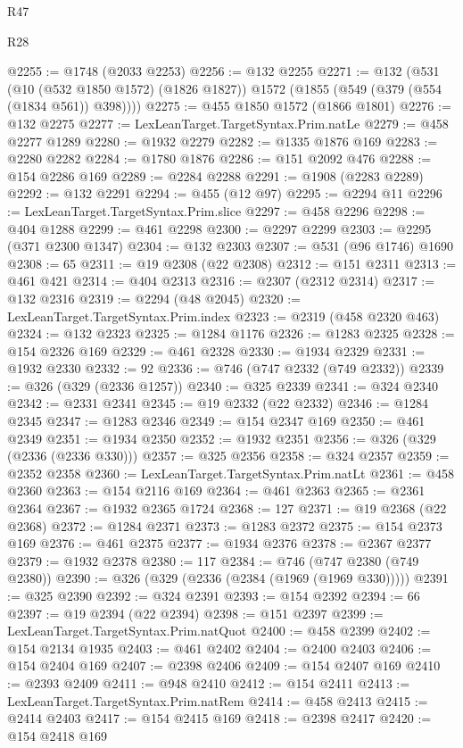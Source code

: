 \begin{lexlean}{R47}
\begin{lexlean}{R28}
\begin{coremodule}
{{{{{{{{{{{{{{{{{{{{{{{{{{{{{{{{{{{{{{{{{{{{{{{{{{{{{{{{{{{{{{{{{{{{{{{{{{{{{{{{{{{{{{{{{{{{{{{{{{{{{{{{{{{{{{{{{{{{{{{{{{{{{{{{{{{{{@2255 := @1748 (@2033 @2253)
@2256 := @132 @2255
@2271 := @132
    (@531
      (@10 (@532 @1850 @1572) (@1826 @1827))
      @1572
      (@1855 (@549 (@379 (@554 (@1834 @561)) @398))))
@2275 := @455 @1850 @1572 (@1866 @1801)
@2276 := @132 @2275
@2277 := LexLeanTarget.TargetSyntax.Prim.natLe
@2279 := @458 @2277 @1289
@2280 := @1932 @2279
@2282 := @1335 @1876 @169
@2283 := @2280 @2282
@2284 := @1780 @1876
@2286 := @151 @2092 @476
@2288 := @154 @2286 @169
@2289 := @2284 @2288
@2291 := @1908 (@2283 @2289)
@2292 := @132 @2291
@2294 := @455 (@12 @97)
@2295 := @2294 @11
@2296 := LexLeanTarget.TargetSyntax.Prim.slice
@2297 := @458 @2296
@2298 := @404 @1288
@2299 := @461 @2298
@2300 := @2297 @2299
@2303 := @2295 (@371 @2300 @1347)
@2304 := @132 @2303
@2307 := @531 (@96 @1746) @1690
@2308 := 65
@2311 := @19 @2308 (@22 @2308)
@2312 := @151 @2311
@2313 := @461 @421
@2314 := @404 @2313
@2316 := @2307 (@2312 @2314)
@2317 := @132 @2316
@2319 := @2294 (@48 @2045)
@2320 := LexLeanTarget.TargetSyntax.Prim.index
@2323 := @2319 (@458 @2320 @463)
@2324 := @132 @2323
@2325 := @1284 @1176
@2326 := @1283 @2325
@2328 := @154 @2326 @169
@2329 := @461 @2328
@2330 := @1934 @2329
@2331 := @1932 @2330
@2332 := 92
@2336 := @746 (@747 @2332 (@749 @2332))
@2339 := @326 (@329 (@2336 @1257))
@2340 := @325 @2339
@2341 := @324 @2340
@2342 := @2331 @2341
@2345 := @19 @2332 (@22 @2332)
@2346 := @1284 @2345
@2347 := @1283 @2346
@2349 := @154 @2347 @169
@2350 := @461 @2349
@2351 := @1934 @2350
@2352 := @1932 @2351
@2356 := @326 (@329 (@2336 (@2336 @330)))
@2357 := @325 @2356
@2358 := @324 @2357
@2359 := @2352 @2358
@2360 := LexLeanTarget.TargetSyntax.Prim.natLt
@2361 := @458 @2360
@2363 := @154 @2116 @169
@2364 := @461 @2363
@2365 := @2361 @2364
@2367 := @1932 @2365 @1724
@2368 := 127
@2371 := @19 @2368 (@22 @2368)
@2372 := @1284 @2371
@2373 := @1283 @2372
@2375 := @154 @2373 @169
@2376 := @461 @2375
@2377 := @1934 @2376
@2378 := @2367 @2377
@2379 := @1932 @2378
@2380 := 117
@2384 := @746 (@747 @2380 (@749 @2380))
@2390 := @326 (@329 (@2336 (@2384 (@1969 (@1969 @330)))))
@2391 := @325 @2390
@2392 := @324 @2391
@2393 := @154 @2392
@2394 := 66
@2397 := @19 @2394 (@22 @2394)
@2398 := @151 @2397
@2399 := LexLeanTarget.TargetSyntax.Prim.natQuot
@2400 := @458 @2399
@2402 := @154 @2134 @1935
@2403 := @461 @2402
@2404 := @2400 @2403
@2406 := @154 @2404 @169
@2407 := @2398 @2406
@2409 := @154 @2407 @169
@2410 := @2393 @2409
@2411 := @948 @2410
@2412 := @154 @2411
@2413 := LexLeanTarget.TargetSyntax.Prim.natRem
@2414 := @458 @2413
@2415 := @2414 @2403
@2417 := @154 @2415 @169
@2418 := @2398 @2417
@2420 := @154 @2418 @169
}}}}}}}}}}}}}}}}}}}}}}}}}}}}}}}}}}}}}}}}}}}}}}}}}}}}}}}}}}}}}}}}}}}}}}}}}}}}}}}}}}}}}}}}}}}}}}}}}}}}}}}}}}}}}}}}}}}}}}}}}}}}}}}}}}}}}
\end{coremodule}
\end{lexlean}
\end{lexlean}
